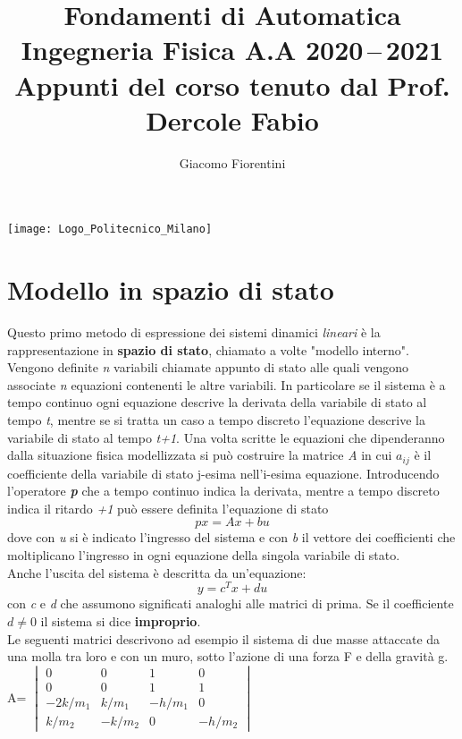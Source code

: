 \documentclass[a4paper]{article}
\begin{document}
	
	
	\title{\textbf{\Huge{Fondamenti di Automatica}} \\ \bigskip   \large{Ingegneria Fisica A.A 2020\,--\,2021\\Appunti del corso tenuto dal Prof. Dercole Fabio}}
	
	\author{Giacomo Fiorentini} 
	\date{}
	
	\maketitle
	\begin{center}
		\texttt{[image: Logo\_Politecnico\_Milano]} \\
	\end{center}
	\tableofcontents
	\newpage
	\section{Modello in spazio di stato}
	Questo primo metodo di espressione dei sistemi dinamici \emph{lineari} è la rappresentazione in \textbf{spazio di stato}, chiamato a volte "modello interno". Vengono definite \emph{n} variabili chiamate appunto di stato alle quali vengono associate \emph{n} equazioni contenenti le altre variabili. In particolare se il sistema è a tempo continuo ogni equazione descrive la derivata della variabile di stato al tempo \emph{t}, mentre se si tratta un caso a tempo discreto l'equazione descrive la variabile di stato al tempo \emph{t+1}. Una volta scritte le equazioni che dipenderanno dalla situazione fisica modellizzata si può costruire la matrice \emph{A} in cui $a_{ij}$ è il coefficiente della variabile di stato j-esima nell'i-esima equazione. Introducendo l'operatore \textbf{\emph{p}} che a tempo continuo indica la derivata, mentre a tempo discreto indica il ritardo \emph{+1} può essere definita l'equazione di stato \[px=Ax+bu\] dove con \emph{u} si è indicato l'ingresso del sistema e con \emph{b} il vettore dei coefficienti che moltiplicano l'ingresso in ogni equazione della singola variabile di stato.
	\newline \\
	Anche l'uscita del sistema è descritta da un'equazione: \[y=c^Tx+du\] con \emph{c} e \emph{d} che assumono significati analoghi alle matrici di prima. Se il coefficiente $d\ne0$ il sistema si dice \textbf{improprio}.
	\newline \\
	Le seguenti matrici descrivono ad esempio il sistema di due masse attaccate da una molla tra loro e con un muro, sotto l'azione di una forza F e della gravità g.
\bigskip \\	A=
	$\begin{vmatrix}
		0 & 0 & 1 & 0 \\
		0 & 0 & 1 & 1 \\
		-2k/m_1 & k/m_1 & -h/m_1 & 0 \\
		k/m_2 & -k/m_2 & 0 & -h/m_2 				
	\end{vmatrix}$
	
\end{document}

